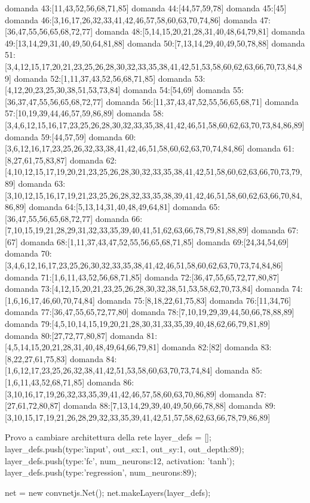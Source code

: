 domanda 43:[11,43,52,56,68,71,85]
domanda 44:[44,57,59,78]
domanda 45:[45]
domanda 46:[3,16,17,26,32,33,41,42,46,57,58,60,63,70,74,86]
domanda 47:[36,47,55,56,65,68,72,77]
domanda 48:[5,14,15,20,21,28,31,40,48,64,79,81]
domanda 49:[13,14,29,31,40,49,50,64,81,88]
domanda 50:[7,13,14,29,40,49,50,78,88]
domanda 51:[3,4,12,15,17,20,21,23,25,26,28,30,32,33,35,38,41,42,51,53,58,60,62,63,66,70,73,84,89]
domanda 52:[1,11,37,43,52,56,68,71,85]
domanda 53:[4,12,20,23,25,30,38,51,53,73,84]
domanda 54:[54,69]
domanda 55:[36,37,47,55,56,65,68,72,77]
domanda 56:[11,37,43,47,52,55,56,65,68,71]
domanda 57:[10,19,39,44,46,57,59,86,89]
domanda 58:[3,4,6,12,15,16,17,23,25,26,28,30,32,33,35,38,41,42,46,51,58,60,62,63,70,73,84,86,89]
domanda 59:[44,57,59]
domanda 60:[3,6,12,16,17,23,25,26,32,33,38,41,42,46,51,58,60,62,63,70,74,84,86]
domanda 61:[8,27,61,75,83,87]
domanda 62:[4,10,12,15,17,19,20,21,23,25,26,28,30,32,33,35,38,41,42,51,58,60,62,63,66,70,73,79,89]
domanda 63:[3,10,12,15,16,17,19,21,23,25,26,28,32,33,35,38,39,41,42,46,51,58,60,62,63,66,70,84,86,89]
domanda 64:[5,13,14,31,40,48,49,64,81]
domanda 65:[36,47,55,56,65,68,72,77]
domanda 66:[7,10,15,19,21,28,29,31,32,33,35,39,40,41,51,62,63,66,78,79,81,88,89]
domanda 67:[67]
domanda 68:[1,11,37,43,47,52,55,56,65,68,71,85]
domanda 69:[24,34,54,69]
domanda 70:[3,4,6,12,16,17,23,25,26,30,32,33,35,38,41,42,46,51,58,60,62,63,70,73,74,84,86]
domanda 71:[1,6,11,43,52,56,68,71,85]
domanda 72:[36,47,55,65,72,77,80,87]
domanda 73:[4,12,15,20,21,23,25,26,28,30,32,38,51,53,58,62,70,73,84]
domanda 74:[1,6,16,17,46,60,70,74,84]
domanda 75:[8,18,22,61,75,83]
domanda 76:[11,34,76]
domanda 77:[36,47,55,65,72,77,80]
domanda 78:[7,10,19,29,39,44,50,66,78,88,89]
domanda 79:[4,5,10,14,15,19,20,21,28,30,31,33,35,39,40,48,62,66,79,81,89]
domanda 80:[27,72,77,80,87]
domanda 81:[4,5,14,15,20,21,28,31,40,48,49,64,66,79,81]
domanda 82:[82]
domanda 83:[8,22,27,61,75,83]
domanda 84:[1,6,12,17,23,25,26,32,38,41,42,51,53,58,60,63,70,73,74,84]
domanda 85:[1,6,11,43,52,68,71,85]
domanda 86:[3,10,16,17,19,26,32,33,35,39,41,42,46,57,58,60,63,70,86,89]
domanda 87:[27,61,72,80,87]
domanda 88:[7,13,14,29,39,40,49,50,66,78,88]
domanda 89:[3,10,15,17,19,21,26,28,29,32,33,35,39,41,42,51,57,58,62,63,66,78,79,86,89]


Provo a cambiare architettura della rete
layer_defs = [];
layer_defs.push({type:'input', out_sx:1, out_sy:1, out_depth:89});
layer_defs.push({type:'fc', num_neurons:12, activation: 'tanh'});
layer_defs.push({type:'regression', num_neurons:89});

net = new convnetjs.Net();
net.makeLayers(layer_defs);


